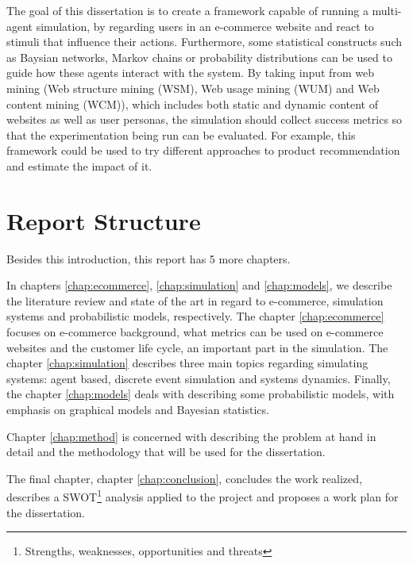 The goal of this dissertation is to create a framework capable of running a
multi-agent simulation, by regarding users in an e-commerce website and react
to stimuli that influence their actions. Furthermore, some statistical constructs such as Baysian networks, Markov chains or probability distributions can be used to guide how these agents interact with the system. By taking input from web mining (Web structure mining (WSM), Web usage mining (WUM) and
Web content mining (WCM)), which includes both static and dynamic content
of websites as well as user personas, the simulation should collect success metrics so that the experimentation being run can be evaluated. For example, this framework could be used to try different approaches to product recommendation and estimate the impact of it.


\section{Report Structure} \label{sec:struct}

Besides this introduction, this report has 5 more chapters.

In chapters \ref{chap:ecommerce}, \ref{chap:simulation} and \ref{chap:models}, we describe the literature review and state of the art in regard to e-commerce, simulation systems and probabilistic models, respectively. The chapter \ref{chap:ecommerce} focuses on e-commerce background, what metrics can be used on e-commerce websites and the customer life cycle, an important part in the simulation. The chapter \ref{chap:simulation} describes three main topics regarding simulating systems: agent based, discrete event simulation and systems dynamics. Finally, the chapter \ref{chap:models} deals with describing some probabilistic models, with emphasis on graphical models and Bayesian statistics.

Chapter \ref{chap:method} is concerned with describing the problem at hand in detail and the methodology that will be used for the dissertation.

The final chapter, chapter \ref{chap:conclusion}, concludes the work realized, describes a SWOT\footnote{Strengths, weaknesses, opportunities and threats} analysis applied to the project and proposes a work plan for the dissertation.
